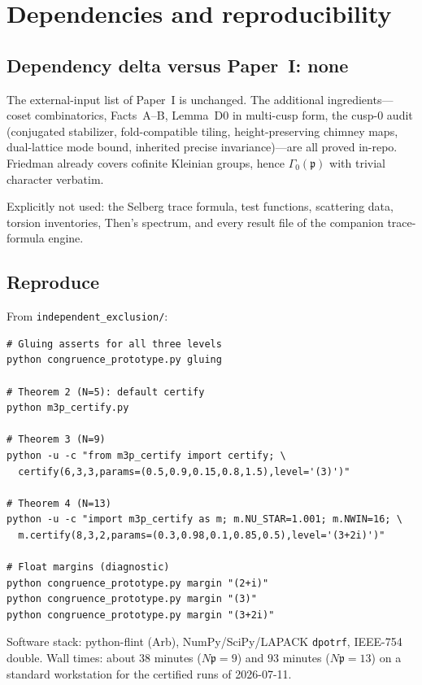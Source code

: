 \documentclass[11pt]{amsart}
\newcommand{\p}{\mathfrak{p}}
\begin{document}
\section{Dependencies and reproducibility}\label{sec:deps}

\subsection{Dependency delta versus Paper~I: none}

The external-input list of Paper~I is unchanged.  The additional
ingredients---coset combinatorics, Facts~A--B, Lemma~D0 in multi-cusp
form, the cusp-$0$ audit (conjugated stabilizer, fold-compatible tiling,
height-preserving chimney maps, dual-lattice mode bound, inherited
precise invariance)---are all proved in-repo.  Friedman
\cite[Thm.~3.8.1]{Friedman} already covers cofinite Kleinian groups,
hence $\Gamma_0(\p)$ with trivial character verbatim.

Explicitly not used: the Selberg trace formula, test functions, scattering
data, torsion inventories, Then's spectrum, and every result file of the
companion trace-formula engine.

\subsection{Reproduce}

From \texttt{independent\_exclusion/}:
\begin{verbatim}
# Gluing asserts for all three levels
python congruence_prototype.py gluing

# Theorem 2 (N=5): default certify
python m3p_certify.py

# Theorem 3 (N=9)
python -u -c "from m3p_certify import certify; \
  certify(6,3,3,params=(0.5,0.9,0.15,0.8,1.5),level='(3)')"

# Theorem 4 (N=13)
python -u -c "import m3p_certify as m; m.NU_STAR=1.001; m.NWIN=16; \
  m.certify(8,3,2,params=(0.3,0.98,0.1,0.85,0.5),level='(3+2i)')"

# Float margins (diagnostic)
python congruence_prototype.py margin "(2+i)"
python congruence_prototype.py margin "(3)"
python congruence_prototype.py margin "(3+2i)"
\end{verbatim}

Software stack: python-flint (Arb), NumPy/SciPy/LAPACK \texttt{dpotrf},
IEEE-754 double.  Wall times: about $38$ minutes ($N\p=9$) and $93$
minutes ($N\p=13$) on a standard workstation for the certified runs of
2026-07-11.
\end{document}
